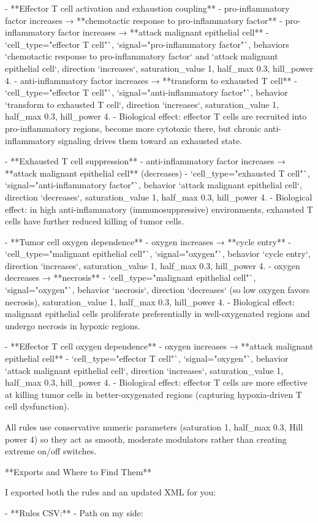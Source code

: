\documentclass[11pt,a4paper]{article}
\begin{document}
\begin{copilotbox}
- **Effector T cell activation and exhaustion coupling**
  - pro-inflammatory factor increases → **chemotactic response to pro-inflammatory factor**
  - pro-inflammatory factor increases → **attack malignant epithelial cell**
    - `cell\_type="effector T cell"`, `signal="pro-inflammatory factor"`, behaviors `chemotactic response to pro-inflammatory factor` and `attack malignant epithelial cell`, direction `increases`, saturation\_value 1, half\_max 0.3, hill\_power 4.
  - anti-inflammatory factor increases → **transform to exhausted T cell**
    - `cell\_type="effector T cell"`, `signal="anti-inflammatory factor"`, behavior `transform to exhausted T cell`, direction `increases`, saturation\_value 1, half\_max 0.3, hill\_power 4.
  - Biological effect: effector T cells are recruited into pro-inflammatory regions, become more cytotoxic there, but chronic anti-inflammatory signaling drives them toward an exhausted state.

- **Exhausted T cell suppression**
  - anti-inflammatory factor increases → **attack malignant epithelial cell** (decreases)
    - `cell\_type="exhausted T cell"`, `signal="anti-inflammatory factor"`, behavior `attack malignant epithelial cell`, direction `decreases`, saturation\_value 1, half\_max 0.3, hill\_power 4.
  - Biological effect: in high anti-inflammatory (immunosuppressive) environments, exhausted T cells have further reduced killing of tumor cells.

- **Tumor cell oxygen dependence**
  - oxygen increases → **cycle entry**
    - `cell\_type="malignant epithelial cell"`, `signal="oxygen"`, behavior `cycle entry`, direction `increases`, saturation\_value 1, half\_max 0.3, hill\_power 4.
  - oxygen decreases → **necrosis**
    - `cell\_type="malignant epithelial cell"`, `signal="oxygen"`, behavior `necrosis`, direction `decreases` (so low oxygen favors necrosis), saturation\_value 1, half\_max 0.3, hill\_power 4.
  - Biological effect: malignant epithelial cells proliferate preferentially in well-oxygenated regions and undergo necrosis in hypoxic regions.

- **Effector T cell oxygen dependence**
  - oxygen increases → **attack malignant epithelial cell**
    - `cell\_type="effector T cell"`, `signal="oxygen"`, behavior `attack malignant epithelial cell`, direction `increases`, saturation\_value 1, half\_max 0.3, hill\_power 4.
  - Biological effect: effector T cells are more effective at killing tumor cells in better-oxygenated regions (capturing hypoxia-driven T cell dysfunction).

All rules use conservative numeric parameters (saturation 1, half\_max 0.3, Hill power 4) so they act as smooth, moderate modulators rather than creating extreme on/off switches.

**Exports and Where to Find Them**

I exported both the rules and an updated XML for you:

- **Rules CSV:**  
  - Path on my side:

\end{copilotbox}
\end{document}
